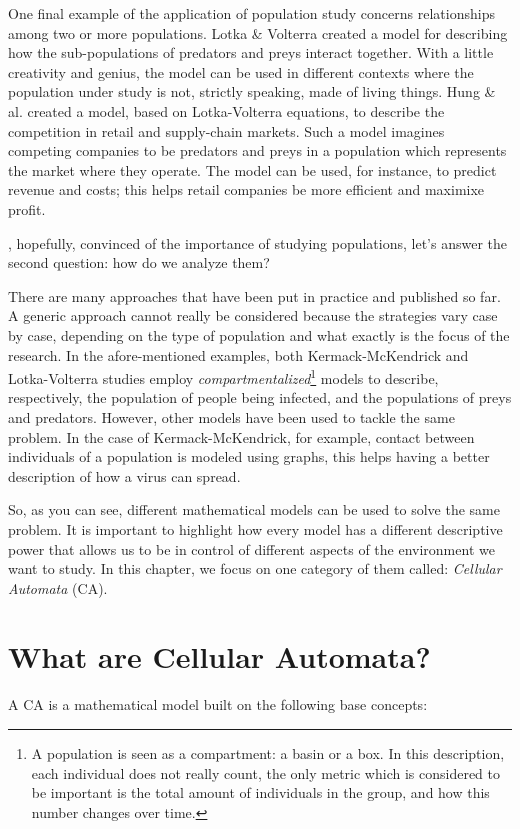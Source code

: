 One final example of the application of population study concerns relationships among two or more
populations. Lotka \& Volterra \cite{lotka-volterra} created a model for describing how
the sub-populations of predators and preys interact together.
With a little creativity and genius, the model can be used in different contexts where the population
under study is not, strictly speaking, made of living things. Hung \& al. \cite{hung-lv} created a model,
based on Lotka-Volterra equations, to describe the competition in retail and supply-chain markets. 
Such a model imagines competing companies to be predators and preys in a population which represents the market
where they operate. The model can be used, for instance, to predict revenue and costs; this helps retail companies be
more efficient and maximixe profit.

, hopefully, convinced of the importance of studying populations, let's answer the
second question: how do we analyze them?

There are many approaches that have been put in practice and published so far. A generic approach cannot
really be considered because the strategies vary case by case, depending on the type of population
and what exactly is the focus of the research. In the afore-mentioned examples, both
Kermack-McKendrick and Lotka-Volterra studies employ
\textit{compartmentalized}\footnote{A population is seen as a compartment: a basin or a box.
In this description, each
individual does not really count, the only metric which is considered to be important
is the total amount of individuals
in the group, and how this number changes over time.}
models to describe,
respectively, the population of people being infected, and the populations of preys and predators.
However, other models have been used to tackle the same problem. In the case of Kermack-McKendrick,
for example, contact between individuals of a population is modeled using graphs, this helps
having a better description of how a virus can spread.

So, as you can see, different mathematical models can be used to solve the same problem. 
It is important to highlight how every model has a different descriptive power that allows us to
be in control of different aspects of the environment we want to study. In this chapter,
we focus on one category of them called: \textit{Cellular Automata} (CA).

\section{What are Cellular Automata?}
A CA is a mathematical model built on the following base concepts:

